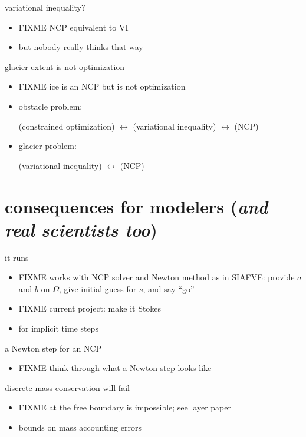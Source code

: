 \documentclass[10pt,hyperref,dvipsnames]{beamer}
\begin{document}
\begin{frame}{variational inequality?}
\begin{itemize}
\item FIXME NCP equivalent to VI
\item but nobody really thinks that way
\end{itemize}
\end{frame}


\begin{frame}{glacier extent is not optimization}
\begin{itemize}
\item FIXME ice is an NCP but is not optimization
\item obstacle problem:

\medskip
(constrained optimization) $\leftrightarrow$ (variational inequality) $\leftrightarrow$ (NCP)

\smallskip
\item glacier problem:

\smallskip
\phantom{(constrained optimization) $\leftrightarrow$} (variational inequality) $\leftrightarrow$ (NCP)
\end{itemize}
\end{frame}


\section{consequences for modelers (\emph{and real scientists too})}

\begin{frame}{it runs}
\begin{itemize}
\item FIXME works with NCP solver and Newton method as in SIAFVE: provide $a$ and $b$ on $\Omega$, give initial guess for $s$, and say ``go''
\item FIXME current project: make it Stokes
\item for implicit time steps
\end{itemize}
\end{frame}

\begin{frame}{a Newton step for an NCP}
\begin{itemize}
\item FIXME think through what a Newton step looks like
\end{itemize}
\end{frame}

\begin{frame}{discrete mass conservation will fail}
\begin{itemize}
\item FIXME at the free boundary is impossible; see layer paper
\item bounds on mass accounting errors
\end{itemize}
\end{frame}
\end{document}
